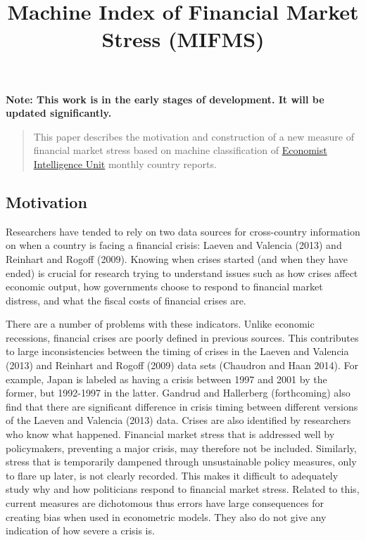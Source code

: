 \documentclass[]{article}
\title{Machine Index of Financial Market Stress (MIFMS)}
\author{}
\date{}
\begin{document}
\maketitle


\textbf{Note: This work is in the early stages of development. It will
be updated significantly.}

\begin{quote}
This paper describes the motivation and construction of a new measure of
financial market stress based on machine classification of
\href{http://www.eiu.com/}{Economist Intelligence Unit} monthly country
reports.
\end{quote}

\subsection{Motivation}\label{motivation}

Researchers have tended to rely on two data sources for cross-country
information on when a country is facing a financial crisis: Laeven and
Valencia (2013) and Reinhart and Rogoff (2009). Knowing when crises
started (and when they have ended) is crucial for research trying to
understand issues such as how crises affect economic output, how
governments choose to respond to financial market distress, and what the
fiscal costs of financial crises are.

There are a number of problems with these indicators. Unlike economic
recessions, financial crises are poorly defined in previous sources.
This contributes to large inconsistencies between the timing of crises
in the Laeven and Valencia (2013) and Reinhart and Rogoff (2009) data
sets (Chaudron and Haan 2014). For example, Japan is labeled as having a
crisis between 1997 and 2001 by the former, but 1992-1997 in the latter.
Gandrud and Hallerberg (forthcoming) also find that there are
significant difference in crisis timing between different versions of
the Laeven and Valencia (2013) data. Crises are also identified by
researchers who know what happened. Financial market stress that is
addressed well by policymakers, preventing a major crisis, may therefore
not be included. Similarly, stress that is temporarily dampened through
unsustainable policy measures, only to flare up later, is not clearly
recorded. This makes it difficult to adequately study why and how
politicians respond to financial market stress. Related to this, current
measures are dichotomous thus errors have large consequences for
creating bias when used in econometric models. They also do not give any
indication of how severe a crisis is.
\end{document}
